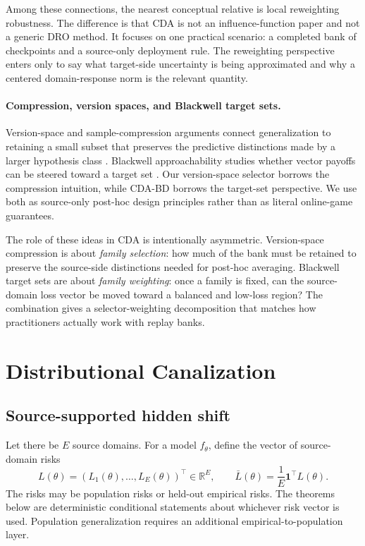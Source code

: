 \documentclass{article}
\theoremstyle{definition}
\newcommand{\RR}{\mathbb{R}}
\newcommand{\one}{\mathbf{1}}
\newcommand{\bd}{\textup{\textsc{CDA-BD}}}
\newcommand{\paren}[1]{\left( #1 \right)}
\begin{document}
Among these connections, the nearest conceptual relative is local reweighting robustness. The difference is that CDA is not an influence-function paper and not a generic DRO method. It focuses on one practical scenario: a completed bank of checkpoints and a source-only deployment rule. The reweighting perspective enters only to say what target-side uncertainty is being approximated and why a centered domain-response norm is the relevant quantity.

\paragraph{Compression, version spaces, and Blackwell target sets.}
Version-space and sample-compression arguments connect generalization to retaining a small subset that preserves the predictive distinctions made by a larger hypothesis class \citep{floyd1989sample,graepel2005pacbayes}. Blackwell approachability studies whether vector payoffs can be steered toward a target set \citep{blackwell1956analog}. Our version-space selector borrows the compression intuition, while \bd{} borrows the target-set perspective. We use both as source-only post-hoc design principles rather than as literal online-game guarantees.

The role of these ideas in CDA is intentionally asymmetric. Version-space compression is about \emph{family selection}: how much of the bank must be retained to preserve the source-side distinctions needed for post-hoc averaging. Blackwell target sets are about \emph{family weighting}: once a family is fixed, can the source-domain loss vector be moved toward a balanced and low-loss region? The combination gives a selector-weighting decomposition that matches how practitioners actually work with replay banks.

\section{Distributional Canalization}
\label{sec:theory}

\subsection{Source-supported hidden shift}

Let there be \(E\) source domains. For a model \(f_\theta\), define the vector of source-domain risks
\[
L(\theta) = \paren{L_1(\theta),\dots,L_E(\theta)}^\top \in \RR^E,
\qquad
\bar L(\theta)=\frac{1}{E}\one^\top L(\theta).
\]
The risks may be population risks or held-out empirical risks. The theorems below are deterministic conditional statements about whichever risk vector is used. Population generalization requires an additional empirical-to-population layer.
\end{document}
